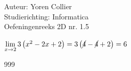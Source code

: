 \documentclass[a4paper]{article}
\newcommand{\Lh}{\left(} %
\newcommand{\Rh}{\right)}
\newcommand{\pnR}{\rightarrow} %
\newcommand{\limiet}{\lim\limits_}
\newcommand{\schrap}{\cancel}
\begin{document}
\noindent \large Auteur: Yoren Collier \\
\noindent \large Studierichting: Informatica\\
\noindent \large Oefeningenreeks 2D nr. 1.5\\

\medskip

\normalsize

$\limiet{x \pnR 2} 3 \Lh x^2 -2x +2 \Rh = 3 \Lh \schrap{4} - \schrap{4}+2 \Rh = 6$\\

\begin{thebibliography}{999}
\end{thebibliography}
\end{document}
